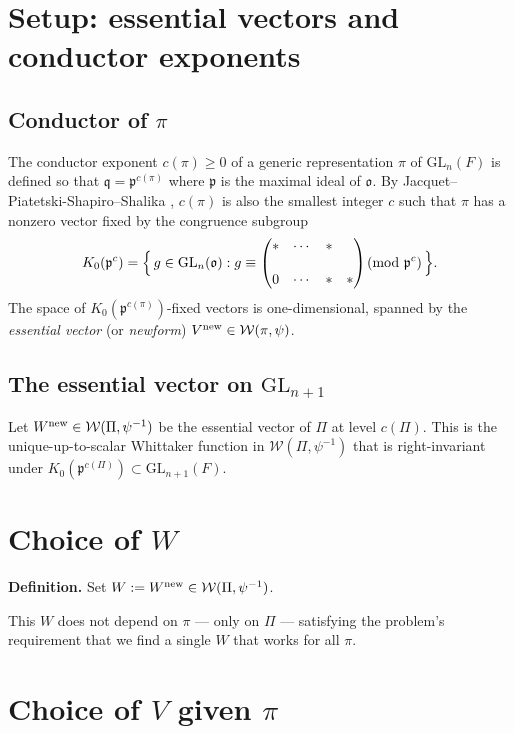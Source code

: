\section*{Setup: essential vectors and conductor exponents}

\subsection*{Conductor of $\pi$}

The conductor exponent $c(\pi)\geq 0$ of a generic representation $\pi$ of $\mathrm{GL}_n(F)$ is defined so that $\mathfrak q=\mathfrak p^{c(\pi)}$ where $\mathfrak p$ is the maximal ideal of $\mathfrak o$.  By Jacquet--Piatetski-Shapiro--Shalika \cite{JPSS81}, $c(\pi)$ is also the smallest integer $c$ such that $\pi$ has a nonzero vector fixed by the congruence subgroup
\[
K_0(\mathfrak p^c) = \Bigl\{\,g\in \mathrm{GL}_n(\mathfrak o) : g\equiv \begin{pmatrix}*&\cdots&*\\&&\\0&\cdots&*&*\end{pmatrix}\!\!\!\pmod{\mathfrak p^c}\,\Bigr\}.
\]
The space of $K_0(\mathfrak p^{c(\pi)})$-fixed vectors is one-dimensional, spanned by the \emph{essential vector} (or \emph{newform}) $V^{\rm new}\in\mathcal W(\pi,\psi)$.

\subsection*{The essential vector on $\mathrm{GL}_{n+1}$}

Let $W^{\rm new}\in\mathcal W(\Pi,\psi^{-1})$ be the essential vector of $\Pi$ at level $c(\Pi)$.  This is the unique-up-to-scalar Whittaker function in $\mathcal W(\Pi,\psi^{-1})$ that is right-invariant under $K_0(\mathfrak p^{c(\Pi)})\subset\mathrm{GL}_{n+1}(F)$.

\section*{Choice of $W$}

\noindent\textbf{Definition.}  Set $W:=W^{\rm new}\in\mathcal W(\Pi,\psi^{-1})$.

This $W$ does not depend on $\pi$ — only on $\Pi$ — satisfying the problem's requirement that we find a single $W$ that works for all $\pi$.

\section*{Choice of $V$ given $\pi$}

